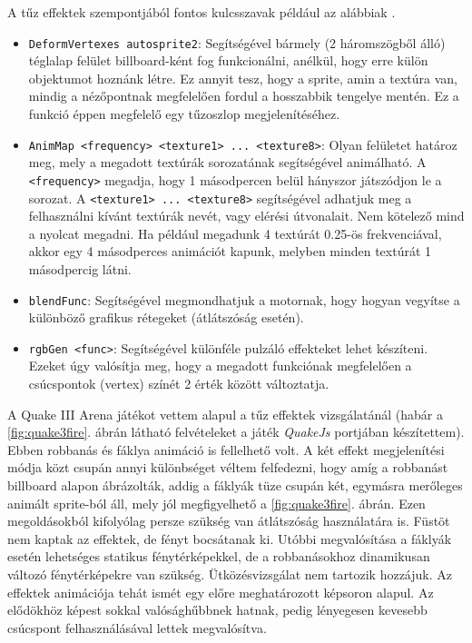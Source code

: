 A tűz effektek szempontjából fontos kulcsszavak például az alábbiak \cite{quake3shaderManual}.
\begin{itemize} 
\item
\texttt{DeformVertexes autosprite2}: Segítségével bármely (2 háromszögből álló) téglalap felület billboard-ként fog funkcionálni, anélkül, hogy erre külön objektumot hoznánk létre. Ez annyit tesz, hogy a sprite, amin a textúra van, mindig a nézőpontnak megfelelően fordul a hosszabbik tengelye mentén. Ez a funkció éppen megfelelő egy tűzoszlop megjelenítéséhez.
\item
\texttt{AnimMap <frequency> <texture1> ... <texture8>}: Olyan felületet határoz meg, mely a megadott textúrák sorozatának segítségével animálható. A \texttt{<frequency>} megadja, hogy 1 másodpercen belül hányszor játszódjon le a sorozat. A \texttt{<texture1> ... <texture8>} segítségével adhatjuk meg a felhasználni kívánt textúrák nevét, vagy elérési útvonalait. Nem kötelező mind a nyolcat megadni. Ha például megadunk 4 textúrát 0.25-ös frekvenciával, akkor egy 4 másodperces animációt kapunk, melyben minden textúrát 1 másodpercig látni. 
\item
\texttt{blendFunc}: Segítségével megmondhatjuk a motornak, hogy hogyan vegyítse a különböző grafikus rétegeket (átlátszóság esetén).
\item
\texttt{rgbGen <func>}: Segítségével különféle pulzáló effekteket lehet készíteni. Ezeket úgy valósítja meg, hogy a megadott funkciónak megfelelően a csúcspontok (vertex) színét 2 érték között változtatja.
\end{itemize}

A Quake III Arena játékot vettem alapul a tűz effektek vizsgálatánál (habár a \ref{fig:quake3fire}. ábrán látható felvételeket a játék \textit{QuakeJs} portjában készítettem). Ebben robbanás és fáklya animáció is fellelhető volt. A két effekt megjelenítési módja közt csupán annyi különbséget véltem felfedezni, hogy amíg a robbanást billboard alapon ábrázolták, addig a fáklyák tüze csupán két, egymásra merőleges animált sprite-ból áll, mely jól megfigyelhető a \ref{fig:quake3fire}. ábrán. Ezen megoldásokból kifolyólag persze szükség van átlátszóság használatára is. Füstöt nem kaptak az effektek, de fényt bocsátanak ki. Utóbbi megvalósítása a fáklyák esetén lehetséges statikus fénytérképekkel, de a robbanásokhoz dinamikusan változó fénytérképekre van szükség. Ütközésvizsgálat nem tartozik hozzájuk. Az effektek animációja tehát ismét egy előre meghatározott képsoron alapul. Az elődökhöz képest sokkal valósághűbbnek hatnak, pedig lényegesen kevesebb csúcspont felhasználásával lettek megvalósítva.

